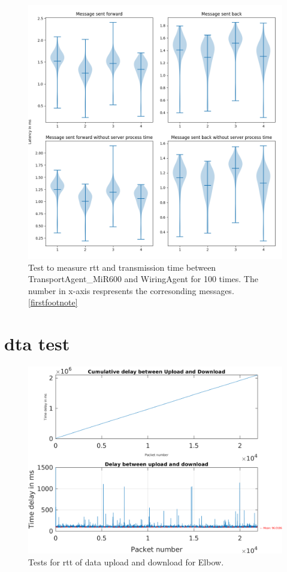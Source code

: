 \begin{figure}[htb]
    \includegraphics[width=\textwidth]{figures/appendix/usecase/violin_TransportAgent_MiR600_to_WiringAgent.png}
    \centering
    \caption{Test to measure \gls{rtt} and transmission time between TransportAgent\_MiR600 and 
    WiringAgent for 100 times. The number in x-axis respresents the 
    corresonding messages. \protect\ref{firstfootnote}}
    \label{fig: violin-T600-WI}
\end{figure}





\section{\gls{dta} test}\label{chap: append-DTagent}
\begin{figure}[htb]
    \includegraphics[width=\textwidth]{figures/appendix/DT/Delay_UploadDownloadCycleTime_Elbow.png}\hfill 
    \caption{Tests for \gls{rtt} of data upload and download for Elbow.} \label{fig: UD-cycle-Elbow}
\end{figure}

